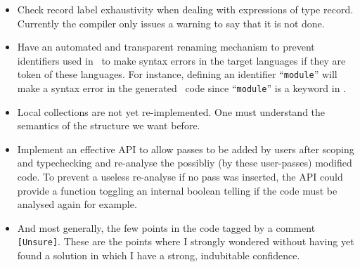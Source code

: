 \begin{itemize}
\item Check record label exhaustivity when dealing with expressions of
  type record. Currently the compiler only issues a warning to say
  that it is not done.
  
\item Have an automated and transparent renaming mechanism to prevent
  identifiers used in \focalize\ to make syntax errors in the target
  languages if they are token of these languages. For instance,
  defining an identifier ``{\tt module}'' will make a syntax error in
  the generated \ocaml\ code since ``{\tt module}'' is a keyword in
  \ocaml.

\item Local collections are not yet re-implemented. One must
  understand the semantics of the structure we want before.

\item Implement an effective API to allow passes to be added by users
  after scoping and typechecking and re-analyse the possibliy (by
  these user-passes) modified code. To prevent a useless re-analyse if
  no pass was inserted, the API could provide a function toggling an
  internal boolean telling if the code must be analysed again for
  example.

\item And most generally, the few points in the code tagged by a
  comment  {\tt [Unsure]}. These are the points where I strongly
  wondered without having yet found a solution in which I have a
  strong, indubitable confidence.
\end{itemize}
